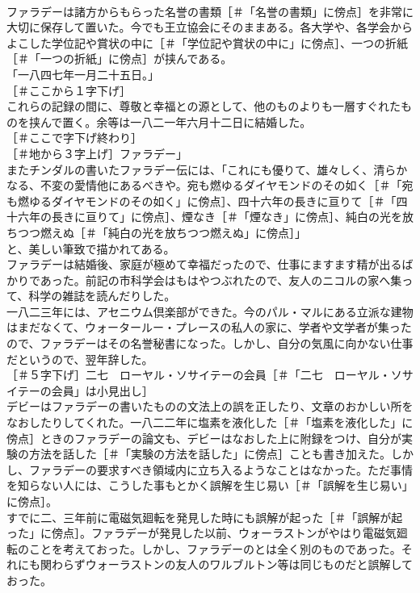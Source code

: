 \documentclass[8pt]{extreport}
\begin{document}
\begin{CJK}{UTF8}{min}
\\	ファラデーは諸方からもらった名誉の書類［＃「名誉の書類」に傍点］を非常に大切に保存して置いた。今でも王立協会にそのままある。各大学や、各学会からよこした学位記や賞状の中に［＃「学位記や賞状の中に」に傍点］、一つの折紙［＃「一つの折紙」に傍点］が挟んである。
\\	「一八四七年一月二十五日。」
\\	［＃ここから１字下げ］
\\	これらの記録の間に、尊敬と幸福との源として、他のものよりも一層すぐれたものを挟んで置く。余等は一八二一年六月十二日に結婚した。
\\	［＃ここで字下げ終わり］
\\	［＃地から３字上げ］ファラデー」
\\	またチンダルの書いたファラデー伝には、「これにも優りて、雄々しく、清らかなる、不変の愛情他にあるべきや。宛も燃ゆるダイヤモンドのその如く［＃「宛も燃ゆるダイヤモンドのその如く」に傍点］、四十六年の長きに亘りて［＃「四十六年の長きに亘りて」に傍点］、煙なき［＃「煙なき」に傍点］、純白の光を放ちつつ燃えぬ［＃「純白の光を放ちつつ燃えぬ」に傍点］」
\\	と、美しい筆致で描かれてある。
\\	ファラデーは結婚後、家庭が極めて幸福だったので、仕事にますます精が出るばかりであった。前記の市科学会はもはやつぶれたので、友人のニコルの家へ集って、科学の雑誌を読んだりした。
\\	一八二三年には、アセニウム倶楽部ができた。今のパル・マルにある立派な建物はまだなくて、ウォータールー・プレースの私人の家に、学者や文学者が集ったので、ファラデーはその名誉秘書になった。しかし、自分の気風に向かない仕事だというので、翌年辞した。
\\	［＃５字下げ］二七　ローヤル・ソサイテーの会員［＃「二七　ローヤル・ソサイテーの会員」は小見出し］
\\	デビーはファラデーの書いたものの文法上の誤を正したり、文章のおかしい所をなおしたりしてくれた。一八二二年に塩素を液化した［＃「塩素を液化した」に傍点］ときのファラデーの論文も、デビーはなおした上に附録をつけ、自分が実験の方法を話した［＃「実験の方法を話した」に傍点］ことも書き加えた。しかし、ファラデーの要求すべき領域内に立ち入るようなことはなかった。ただ事情を知らない人には、こうした事もとかく誤解を生じ易い［＃「誤解を生じ易い」に傍点］。
\\	すでに二、三年前に電磁気廻転を発見した時にも誤解が起った［＃「誤解が起った」に傍点］。ファラデーが発見した以前、ウォーラストンがやはり電磁気廻転のことを考えておった。しかし、ファラデーのとは全く別のものであった。それにも関わらずウォーラストンの友人のワルブルトン等は同じものだと誤解しておった。

\end{CJK}
\end{document}
